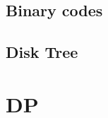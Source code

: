         \subsection{Binary codes}        
                
        \subsection{Disk Tree}        
                
%                 
%                 

%                 

\section{DP}
